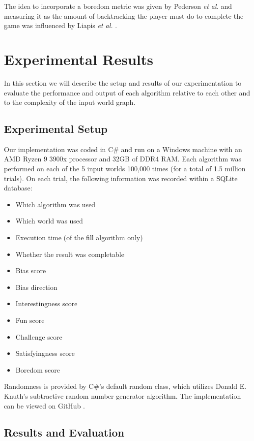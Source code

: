 \documentclass{ieeeaccess}
\begin{document}
The idea to incorporate a boredom metric was given by Pederson {\it et al.} \cite{b6} and
measuring it as the amount of backtracking the player must do to complete the game was
influenced by Liapis {\it et al.} \cite{b4}.

\section{Experimental Results}
In this section we will describe the setup and results of our experimentation to evaluate the
performance and output of each algorithm relative to each other and to the complexity of the
input world graph.


\subsection{Experimental Setup}
Our implementation was coded in C\# and run on a Windows machine with an AMD Ryzen 9 3900x
processor and 32GB of DDR4 RAM. Each algorithm was performed on each of the 5 input worlds
100,000 times (for a total of 1.5 million trials). On each trial, the following information was
recorded within a SQLite database:

\begin{itemize}
    \item Which algorithm was used
    \item Which world was used
    \item Execution time (of the fill algorithm only)
    \item Whether the result was completable
    \item Bias score
    \item Bias direction
    \item Interestingness score
    \item Fun score
    \item Challenge score
    \item Satisfyingness score
    \item Boredom score
\end{itemize}

Randomness is provided by C\#’s default random class, which utilizes Donald E. Knuth’s
subtractive random number generator algorithm. The implementation can be viewed on GitHub
\cite{b13}.

\subsection{Results and Evaluation}
\end{document}
